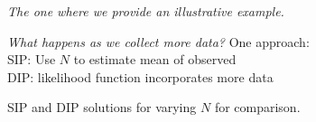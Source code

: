 \begin{frame}[t]{\it The one where we provide an illustrative example.}

\centering
\emph{What happens as we collect more data?}
\vskip 10pt
One approach: \\
SIP: Use $N$ to estimate mean of observed \\
DIP: likelihood function incorporates more data

\begin{figure}
\centering
 \label{fig:bayes-comparison-convergence}
\end{figure}

SIP and DIP solutions for varying $N$ for comparison.

\end{frame}
